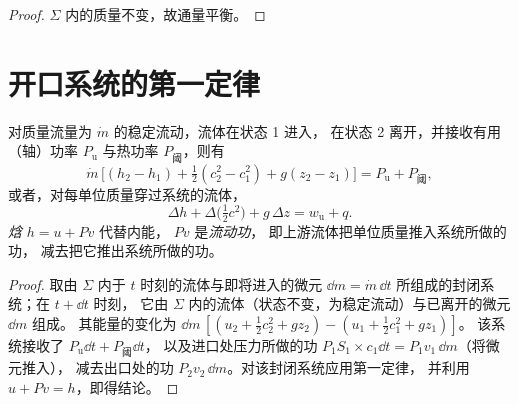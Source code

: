 \begin{proof}
$\Sigma$ 内的质量不变，故通量平衡。
\end{proof}

\section{开口系统的第一定律}

\begin{theorem}[单股稳定流动的能量平衡]\label{thm:b2:open-systems:firstlaw}
对质量流量为 $\dot m$ 的稳定流动，流体在状态 1 进入，
在状态 2 离开，并接收有用（轴）功率
$P_{\text{u}}$ 与热功率 $P_{\text{阈}}$，则有
\[
\dot m\,\Big[(h_2 - h_1) + \tfrac12(c_2^2 - c_1^2) + g(z_2 - z_1)\Big]
= P_{\text{u}} + P_{\text{阈}} ,
\]
或者，对每单位质量穿过系统的流体，
\[
\Delta h + \Delta\big(\tfrac12c^2\big) + g\,\Delta z = w_{\text{u}} + q .
\]
\emph{焓} $h = u + Pv$ 代替内能，
$Pv$ 是\emph{流动功}，
即上游流体把单位质量推入系统所做的功，
减去把它推出系统所做的功。
\end{theorem}

\begin{proof}
取由 $\Sigma$ 内于 $t$ 时刻的流体与即将进入的微元
$\dd m = \dot m\,\dd t$ 所组成的封闭系统；在 $t + \dd t$ 时刻，
它由 $\Sigma$ 内的流体（状态不变，为稳定流动）与已离开的微元 $\dd m$ 组成。
其能量的变化为
$\dd m\,[(u_2 + \tfrac12c_2^2 + gz_2) - (u_1 + \tfrac12c_1^2 + gz_1)]$。
该系统接收了 $P_{\text{u}}\dd t + P_{\text{阈}}\dd t$，
以及进口处压力所做的功 $P_1S_1 \times c_1\dd t = P_1v_1\,\dd m$（将微元推入），
减去出口处的功 $P_2v_2\,\dd m$。对该封闭系统应用第一定律，
并利用 $u + Pv = h$，即得结论。
\end{proof}

